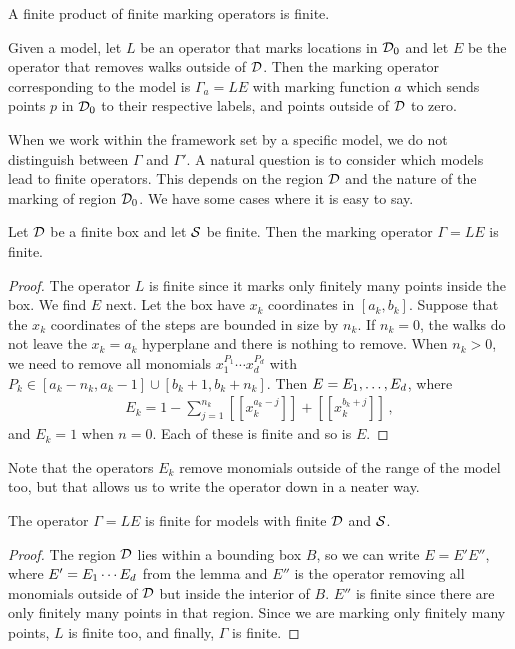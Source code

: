 \begin{lem} A finite product of finite marking operators is finite.
\end{lem}

\begin{defn} Given a \dD model, let $L$ be an operator that marks locations in $\mathcal{D}_0$ and let $E$ be the operator that removes walks outside of $\mathcal{D}$. Then the marking operator corresponding to the model is $\Gamma_a = LE$ with marking function $a$ which sends points $p$ in $\mathcal{D}_0$ to their respective labels, and points outside of $\mathcal{D}$ to zero.
\end{defn}

When we work within the framework set by a specific model, we do not distinguish between $\Gamma$ and $\Gamma'$. A natural question is to consider which models lead to finite operators. This depends on the region $\mathcal{D}$ and the nature of the marking of region $\mathcal{D}_0 $. We have some cases where it is easy to say.

\begin{lem} Let $\mathcal{D}$ be a finite box and let $\mathcal{S}$ be finite. Then the marking operator $\Gamma = LE$ is finite.
\end{lem}
\begin{proof} The operator $L$ is finite since it marks only finitely many points inside the box. We find $E$ next. Let the box have $x_k$ coordinates in $[a_k,b_k]$. Suppose that the $x_k$ coordinates of the steps are bounded in size by $n_k$. If $n_k = 0$, the walks do not leave the $x_k = a_k$ hyperplane and there is nothing to remove. When $n_k > 0$, we need to remove all monomials $x_1^{P_1}\cdots x_d^{P_d}$ with $P_k \in [a_k-n_k,a_k-1]\cup [b_k + 1,b_k + n_k]$. Then $E = E_1,\ldots, E_d$, where
\begin{align}
	E_k = 1 - \sum_{j=1}^{n_k} [[x_k^{a_k-j}]] + [[x_k^{b_k + j}]]\,,
\end{align}
and $E_k = 1$ when $n = 0$. Each of these is finite and so is $E$.
\end{proof}
Note that the operators $E_k$ remove monomials outside of the range of the model too, but that allows us to write the operator down in a neater way.
\begin{thm} The operator $\Gamma = LE$ is finite for models with finite $\mathcal{D}$ and $\mathcal{S}$.
\end{thm}
\begin{proof} The region $\mathcal{D}$ lies within a bounding box $B$, so we can write $E = E' E''$, where $E' = E_1\cdots E_d$ from the lemma and $E''$ is the operator removing all monomials outside of $\mathcal{D}$ but inside the interior of $B$. $E''$ is finite since there are only finitely many points in that region. Since we are marking only finitely many points, $L$ is finite too, and finally, $\Gamma$ is finite.
\end{proof}

